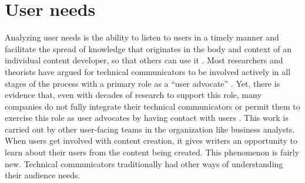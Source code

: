 \section{User needs}
Analyzing user needs is the ability to listen to users in a timely manner and facilitate the spread of knowledge that originates in the body and context of an individual content developer, so that others can use it \cite{johnson2013solving}. Most researchers and theorists have argued for technical communicators to be involved actively in all stages of the process with a primary role as a “user advocate” \cite{carroll1996ten, redish2010technical, spinuzzi2000investigating}. Yet, there is evidence that, even with decades of research to support this role, many companies do not fully integrate their technical communicators or permit them to exercise this role as user advocates by having contact with users \cite{virtaluoto2014death}. This work is carried out by other user-facing teams in the organization like business analysts. When users get involved with content creation, it gives writers an opportunity to learn about their users from the content being created. This phenomenon is fairly new. Technical communicators traditionally had other ways of understanding their audience needs.

